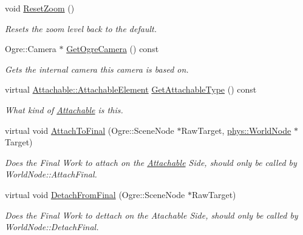 \begin{DoxyCompactItemize}
void \hyperlink{classphys_1_1Camera_a181465e6add36c07a63fdd26aee7c69a}{ResetZoom} ()
\begin{DoxyCompactList}\small\item\em Resets the zoom level back to the default. \item\end{DoxyCompactList}\item 
Ogre::Camera $\ast$ \hyperlink{classphys_1_1Camera_a4f78f7a62580fa538d5bf2cb361644b2}{GetOgreCamera} () const 
\begin{DoxyCompactList}\small\item\em Gets the internal camera this camera is based on. \item\end{DoxyCompactList}\item 
virtual \hyperlink{classphys_1_1Attachable_acd1fca033e7cc0bb3024a92d466d213a}{Attachable::AttachableElement} \hyperlink{classphys_1_1Camera_a4dce38bad69f1bc58f510ce01d6d6edf}{GetAttachableType} () const 
\begin{DoxyCompactList}\small\item\em What kind of \hyperlink{classphys_1_1Attachable}{Attachable} is this. \item\end{DoxyCompactList}\item 
virtual void \hyperlink{classphys_1_1Camera_afaa81ebb01f1c64a324f802b6743b6f7}{AttachToFinal} (Ogre::SceneNode $\ast$RawTarget, \hyperlink{classphys_1_1WorldNode}{phys::WorldNode} $\ast$Target)
\begin{DoxyCompactList}\small\item\em Does the Final Work to attach on the \hyperlink{classphys_1_1Attachable}{Attachable} Side, should only be called by WorldNode::AttachFinal. \item\end{DoxyCompactList}\item 
virtual void \hyperlink{classphys_1_1Camera_a087e4e09b4b0c7adf4c267c5e8e1a6d9}{DetachFromFinal} (Ogre::SceneNode $\ast$RawTarget)
\begin{DoxyCompactList}\small\item\em Does the Final Work to dettach on the Atachable Side, should only be called by WorldNode::DetachFinal. \item\end{DoxyCompactList}\end{DoxyCompactItemize}

